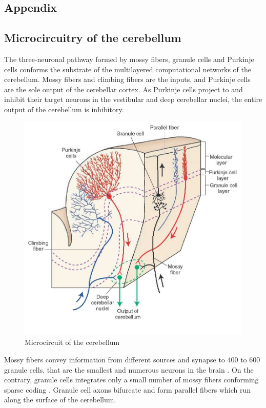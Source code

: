 \documentclass[12pt, a4paper,twoside]{tesi_upf}
\begin{document}
\begin{appendices}

\chapter{Appendix}

\section{Microcircuitry of the cerebellum}

The three-neuronal pathway formed by mossy fibers, granule cells and Purkinje cells conforms the substrate of the multilayered computational networks of the cerebellum. Mossy fibers and climbing fibers are the inputs, and Purkinje cells are the sole output of the cerebellar cortex. As Purkinje cells project to and inhibit their target neurons in the vestibular and deep cerebellar nuclei, the entire output of the cerebellum is inhibitory.

\begin{figure}
  \centering
  \includegraphics[scale=1]{images/circuit.jpg}
  \caption[Microcircuit of the cerebellum]{Microcircuit of the cerebellum}
\end{figure}

Mossy fibers convey information from different sources and synapse to 400 to 600 granule cells, that are the smallest and numerous neurons in the brain \cite{Marr1969}. On the contrary, granule cells integrates only a small number of mossy fibers conforming sparse coding \cite{Ito2006}. Granule cell axons bifurcate and form parallel fibers which run along the surface of the cerebellum.


\end{appendices}
\end{document}
